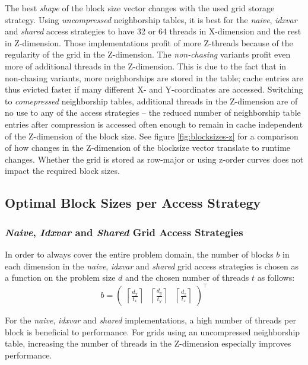 The best \emph{shape} of the block size vector changes with the used grid storage strategy. Using \emph{uncompressed} neighborship tables, it is best for the \emph{naive}, \emph{idxvar} and \emph{shared} access strategies to have 32 or 64 threads in X-dimension and the rest in Z-dimension. Those implementations profit of more Z-threads because of the regularity of the grid in the Z-dimension. The \emph{non-chasing} variants profit even more of additional threads in the Z-dimension. This is due to the fact that in non-chasing variants, more neighborships are stored in the table; cache entries are thus evicted faster if many different X- and Y-coordinates are accessed. Switching to \emph{comepressed} neighborship tables, additional threads in the Z-dimension are of no use to any of the access strategies -- the reduced number of neighborship table entries after compression is accessed often enough to remain in cache independent of the Z-dimension of the block size. See figure \ref{fig:blocksizes-z} for a comparison of how changes in the Z-dimension of the blocksize vector translate to runtime changes. Whether the grid is stored as row-major or using z-order curves does not impact the required block sizes.

\subsection{Optimal Block Sizes per Access Strategy}

\subsubsection{\emph{Naive}, \emph{Idxvar} and \emph{Shared} Grid Access Strategies}
In order to always cover the entire problem domain, the number of blocks $b$ in each dimension in the \emph{naive}, \emph{idxvar} and \emph{shared} grid access strategies is chosen as a function on the problem size $d$ and the chosen number of threads $t$ as follows:
$$b = \begin{pmatrix}\left\lceil\frac{d_x}{t_x}\right\rceil & \left\lceil\frac{d_y}{t_y}\right\rceil & \left\lceil\frac{d_z}{t_z}\right\rceil\end{pmatrix}^\top$$

For the \emph{naive}, \emph{idxvar} and \emph{shared} implementations, a high number of threads per block is beneficial to performance. For grids using an uncompressed neighborship table, increasing the number of threads in the Z-dimension especially improves performance.

